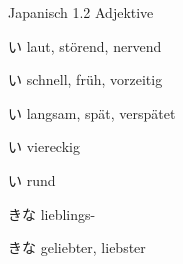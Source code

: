 \begin{multicols*}{2}
\begin{flushleft}
\begin{labeling}{Japanisch 1.2 Adjektive}
	\item [\ruby{煩}{うるさ}い] laut, störend, nervend
	
	\item [\ruby{早}{はや}い] schnell, früh, vorzeitig
	\item [\ruby{遅}{おそ}い] langsam, spät, verspätet
	
	\item [\ruby{四角}{しかく}い] viereckig
	\item [\ruby{円}{まる}い] rund
	
	\item [\ruby{好}{す}きな] lieblings-
	\item [\ruby{大好}{だいす}きな] geliebter, liebster
\end{labeling}
\end{flushleft}
\end{multicols*}

\clearpage